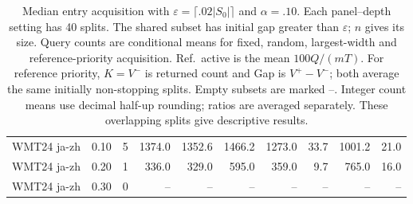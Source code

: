 \begin{table}[t]
\begin{tabular}{llrrrrrrrr}
WMT24 ja-zh & 0.10 & 5 & 1374.0 & 1352.6 & 1466.2 & 1273.0 & 33.7 & 1001.2 & 21.0 \\
WMT24 ja-zh & 0.20 & 1 & 336.0 & 329.0 & 595.0 & 359.0 & 9.7 & 765.0 & 16.0 \\
WMT24 ja-zh & 0.30 & 0 & -- & -- & -- & -- & -- & -- & -- \\
\bottomrule
\end{tabular}
\caption{Median entry acquisition with $\varepsilon=\lceil .02|S_0|\rceil$ and $\alpha=.10$. Each panel--depth setting has 40 splits. The shared subset has initial gap greater than $\varepsilon$; $n$ gives its size. Query counts are conditional means for fixed, random, largest-width and reference-priority acquisition. Ref.\ active is the mean $100Q/(mT)$. For reference priority, $K=V^-$ is returned count and Gap is $V^+-V^-$; both average the same initially non-stopping splits. Empty subsets are marked --. Integer count means use decimal half-up rounding; ratios are averaged separately. These overlapping splits give descriptive results.}
\label{tab:nontrivial-median-tolerant}
\end{table}
